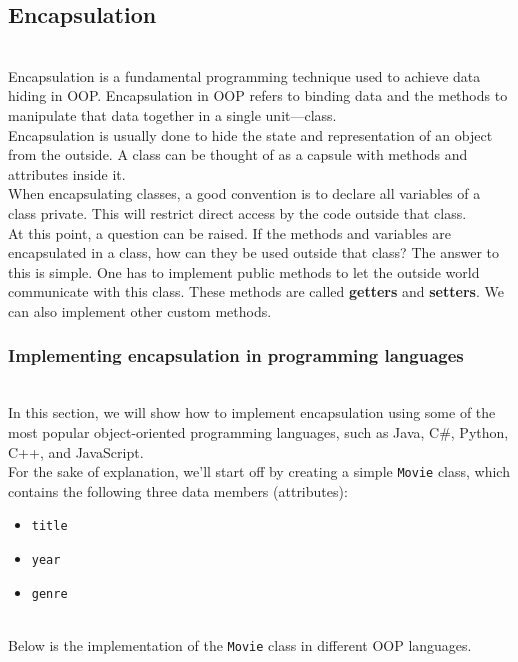 \subsection{Encapsulation}\label{F_kzbH9l-ET7xj_ZUd4Bg}
\\
Encapsulation is a fundamental programming technique used to achieve data hiding in OOP. Encapsulation in OOP refers to binding data and the methods to manipulate that data together in a single unit---class.
\\
Encapsulation is usually done to hide the state and representation of an object from the outside. A class can be thought of as a capsule with methods and attributes inside it.
\\
When encapsulating classes, a good convention is to declare all variables of a class private. This will restrict direct access by the code outside that class.
\\
At this point, a question can be raised. If the methods and variables are encapsulated in a class, how can they be used outside that class? The answer to this is simple. One has to implement public methods to let the outside world communicate with this class. These methods are called \textbf{getters} and \textbf{setters}. We can also implement other custom methods.

\subsubsection{Implementing encapsulation in programming languages}\label{1zNsWvURzPwcZNFTlB2_m}
\\
In this section, we will show how to implement encapsulation using some of the most popular object-oriented programming languages, such as Java, C\#, Python, C++, and JavaScript.
\\
For the sake of explanation, we'll start off by creating a simple \texttt{Movie} class, which contains the following three data members (attributes):

\begin{itemize}
\item
\protect{}\label{5G90t7XNc_5Xt79JYw7FJ}
\texttt{title}
\item
\protect{}\label{z229LSFXRqZjbsbLCOzRS}
\texttt{year}
\item
\protect{}\label{dA2SXTo-9Fkbx_usWRgJf}
\texttt{genre}
\end{itemize}
\\
Below is the implementation of the \texttt{Movie} class in different OOP languages.

